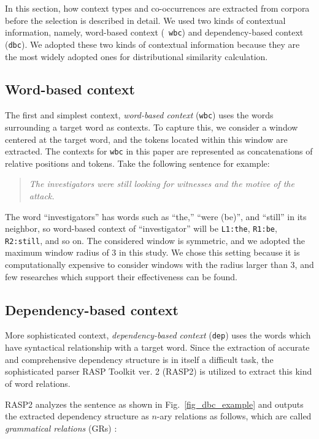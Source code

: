 \documentclass[english]{jnlp_1.4}
\begin{document}
In this section, how context types and co-occurrences are extracted
from corpora before the selection is described in detail. We used two
kinds of contextual information, namely, word-based context ({\tt
wbc}) and dependency-based context ({\tt dbc}). We adopted these two
kinds of contextual information because they are the most widely
adopted ones for distributional similarity calculation.

\subsection{Word-based context}

The first and simplest context, {\em word-based context} ({\tt wbc})
uses the words surrounding a target word as contexts. To capture this,
we consider a window centered at the target word, and the tokens
located within this window are extracted. The contexts for {\tt wbc}
in this paper are represented as concatenations of relative positions
and tokens. Take the following sentence for example:
\begin{quotation}
{\em The investigators were still looking for witnesses and the motive of the attack.}
\end{quotation}
The word ``investigators'' has words such as ``the,''
``were (be)'', and ``still'' in its neighbor, so word-based context of
``investigator'' will be {\tt L1:the}, {\tt R1:be}, {\tt R2:still},
and so on.  The considered window is symmetric, and we adopted the
maximum window radius of 3 in this study. We chose this setting
because it is computationally expensive to consider windows with the
radius larger than 3, and few researches which support their
effectiveness can be found.


\subsection{Dependency-based context}

More sophisticated context, {\em dependency-based context} ({\tt dep})
uses the words which have syntactical relationship with a target
word. Since the extraction of accurate and comprehensive dependency
structure is in itself a difficult task, the sophisticated parser RASP
Toolkit ver. 2 (RASP2) \cite{Briscoe:06} is utilized to extract this
kind of word relations.

RASP2 analyzes the sentence as shown in Fig.~\ref{fig_dbc_example} and
outputs the extracted dependency structure as $n$-ary relations as
follows, which are called {\em grammatical relations} (GRs)
\cite{Briscoe:02:gr}: 
\end{document}

